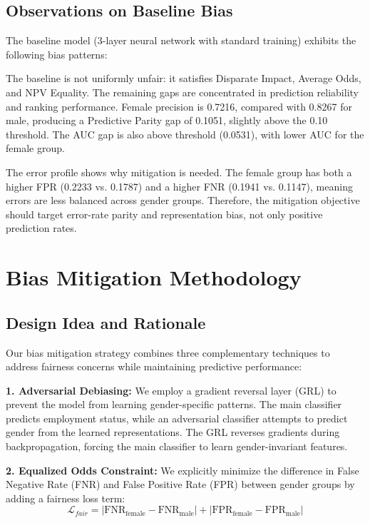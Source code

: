 \documentclass[11pt,a4paper]{article}
\begin{document}
\subsection{Observations on Baseline Bias}

The baseline model (3-layer neural network with standard training) exhibits the following bias patterns:

The baseline is not uniformly unfair: it satisfies Disparate Impact, Average Odds, and NPV Equality. The remaining gaps are concentrated in prediction reliability and ranking performance. Female precision is 0.7216, compared with 0.8267 for male, producing a Predictive Parity gap of 0.1051, slightly above the 0.10 threshold. The AUC gap is also above threshold (0.0531), with lower AUC for the female group.

The error profile shows why mitigation is needed. The female group has both a higher FPR (0.2233 vs. 0.1787) and a higher FNR (0.1941 vs. 0.1147), meaning errors are less balanced across gender groups. Therefore, the mitigation objective should target error-rate parity and representation bias, not only positive prediction rates.




\section{Bias Mitigation Methodology}
\label{sec:mitigation}

\subsection{Design Idea and Rationale}

Our bias mitigation strategy combines three complementary techniques to address fairness concerns while maintaining predictive performance:

\textbf{1. Adversarial Debiasing:} We employ a gradient reversal layer (GRL) to prevent the model from learning gender-specific patterns. The main classifier predicts employment status, while an adversarial classifier attempts to predict gender from the learned representations. The GRL reverses gradients during backpropagation, forcing the main classifier to learn gender-invariant features.

\textbf{2. Equalized Odds Constraint:} We explicitly minimize the difference in False Negative Rate (FNR) and False Positive Rate (FPR) between gender groups by adding a fairness loss term:
\begin{equation}
\mathcal{L}_{fair} = |\text{FNR}_{\text{female}} - \text{FNR}_{\text{male}}| + |\text{FPR}_{\text{female}} - \text{FPR}_{\text{male}}|
\end{equation}
\end{document}
